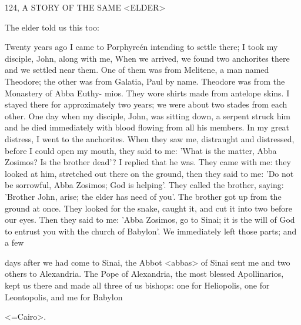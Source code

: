 124, A STORY OF THE SAME <ELDER>

The elder told us this too:

Twenty years ago I came to Porphyreén intending to settle there; I
took my disciple, John, along with me, When we arrived, we found
two anchorites there and we settled near them. One of them was
from Melitene, a man named Theodore; the other was from Galatia,
Paul by name. Theodore was from the Monastery of Abba Euthy-
mios. They wore shirts made from antelope skins. I stayed there for
approximately two years; we were about two stades from each
other. One day when my disciple, John, was sitting down, a serpent
struck him and he died immediately with blood flowing from all his
members. In my great distress, I went to the anchorites. When they
saw me, distraught and distressed, before I could open my mouth,
they said to me: 'What is the matter, Abba Zosimos? Is the brother
dead'? I replied that he was. They came with me: they looked at
him, stretched out there on the ground, then they said to me: 'Do
not be sorrowful, Abba Zosimos; God is helping'. They called the
brother, saying: 'Brother John, arise; the elder has need of you'. The
brother got up from the ground at once. They looked for the snake,
caught it, and cut it into two before our eyes. Then they said to me:
'Abba Zosimos, go to Sinai; it is the will of God to entrust you with
the church of Babylon'. We immediately left those parts; and a few

days after we had come to Sinai, the Abbot <abbas> of Sinai sent
me and two others to Alexandria. The Pope of Alexandria, the most
blessed Apollinarios, kept us there and made all three of us bishops:
one for Heliopolis, one for Leontopolis, and me for Babylon

<=Cairo>.

